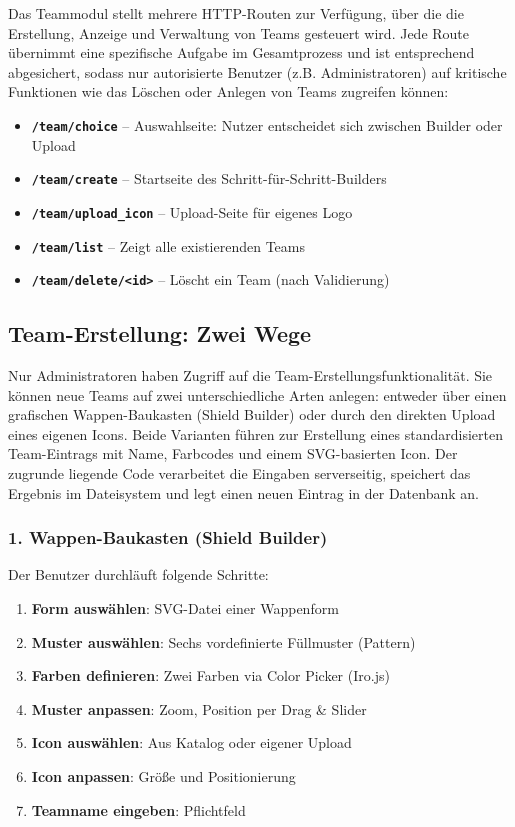 \documentclass[12pt]{article}
\begin{document}
Das Teammodul stellt mehrere HTTP-Routen zur Verfügung, über die die Erstellung, Anzeige und Verwaltung von Teams gesteuert wird. Jede Route übernimmt eine spezifische Aufgabe im Gesamtprozess und ist entsprechend abgesichert, sodass nur autorisierte Benutzer (z.B. Administratoren) auf kritische Funktionen wie das Löschen oder Anlegen von Teams zugreifen können:

\begin{itemize}
  \item \textbf{\texttt{/team/choice}} – Auswahlseite: Nutzer entscheidet sich zwischen Builder oder Upload
  \item \textbf{\texttt{/team/create}} – Startseite des Schritt-für-Schritt-Builders
  \item \textbf{\texttt{/team/upload\_icon}} – Upload-Seite für eigenes Logo
  \item \textbf{\texttt{/team/list}} – Zeigt alle existierenden Teams
  \item \textbf{\texttt{/team/delete/<id>}} – Löscht ein Team (nach Validierung)
\end{itemize}


\subsection{Team-Erstellung: Zwei Wege}

Nur Administratoren haben Zugriff auf die Team-Erstellungsfunktionalität. Sie können neue Teams auf zwei unterschiedliche Arten anlegen: entweder über einen grafischen Wappen-Baukasten (Shield Builder) oder durch den direkten Upload eines eigenen Icons. Beide Varianten führen zur Erstellung eines standardisierten Team-Eintrags mit Name, Farbcodes und einem SVG-basierten Icon. Der zugrunde liegende Code verarbeitet die Eingaben serverseitig, speichert das Ergebnis im Dateisystem und legt einen neuen Eintrag in der Datenbank an.

\subsubsection*{1. Wappen-Baukasten (Shield Builder)}

Der Benutzer durchläuft folgende Schritte:

\begin{enumerate}
  \item \textbf{Form auswählen}: SVG-Datei einer Wappenform
  \item \textbf{Muster auswählen}: Sechs vordefinierte Füllmuster (Pattern)
  \item \textbf{Farben definieren}: Zwei Farben via Color Picker (Iro.js)
  \item \textbf{Muster anpassen}: Zoom, Position per Drag \& Slider
  \item \textbf{Icon auswählen}: Aus Katalog oder eigener Upload
  \item \textbf{Icon anpassen}: Größe und Positionierung
  \item \textbf{Teamname eingeben}: Pflichtfeld
\end{enumerate}
\end{document}
